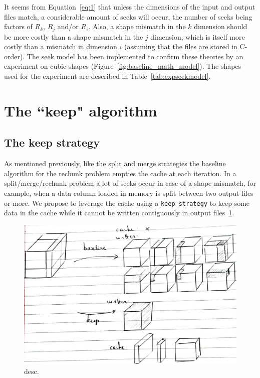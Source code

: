 \documentclass[conference]{IEEEtran}
\begin{document}
It seems from Equation~\ref{eq:1} that unless the dimensions of the input and
output files match, a considerable amount of seeks will occur, the number of
seeks being factors of $R_k$, $R_j$ and/or $R_i$. Also, a shape mismatch in the
$k$ dimension should be more costly than a shape mismatch in the $j$ dimension,
which is itself more costly than a mismatch in dimension $i$ (assuming that the
files are stored in C-order). The seek model has been implemented to confirm
these theories by an experiment on cubic shapes
(Figure~\ref{fig:baseline_math_model}). The shapes used for the experiment are
described in Table~\ref{tab:expseekmodel}.

\section{The ``keep" algorithm}

\subsection{The keep strategy}

As mentioned previously, like the split and merge strategies the baseline
algorithm for the rechunk problem empties the cache at each iteration. In a
split/merge/rechunk problem a lot of seeks occur in case of a shape mismatch,
for example, when a data column loaded in memory is split between two output
files or more. We propose to leverage the cache using a \texttt{keep strategy}
to keep some data in the cache while it cannot be written contiguously in output
files~\ref{fig:keepvsbaseline}.

\begin{figure}[h]
\centering
\includegraphics[scale=0.25]{./figures/new/naive_vs_keep.jpeg}
\caption{desc.}
\label{fig:keepvsbaseline}
\end{figure}
\end{document}
